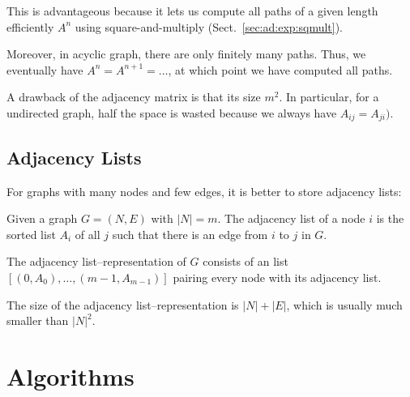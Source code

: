 This is advantageous because it lets us compute all paths of a given length efficiently $A^n$ using square-and-multiply (Sect.~\ref{sec:ad:exp:sqmult}).

Moreover, in acyclic graph, there are only finitely many paths.
Thus, we eventually have $A^n=A^{n+1}=\ldots$, at which point we have computed all paths.

A drawback of the adjacency matrix is that its size $m^2$.
In particular, for a undirected graph, half the space is wasted because we always have $A_{ij}=A_{ji})$.

\subsection{Adjacency Lists}

For graphs with many nodes and few edges, it is better to store adjacency lists:

\begin{definition}
Given a graph $G=(N,E)$ with $|N|=m$.
The adjacency list of a node $i$ is the sorted list $A_i$ of all $j$ such that there is an edge from $i$ to $j$ in $G$.

The adjacency list--representation of $G$ consists of an list $[(0,A_0),\ldots,(m-1,A_{m-1})]$ pairing every node with its adjacency list.
\end{definition}

The size of the adjacency list--representation is $|N|+|E|$, which is usually much smaller than $|N|^2$.

%
%

\section{Algorithms}

%
%
%

